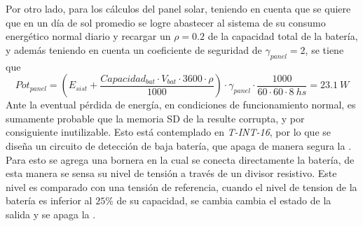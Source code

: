 Por otro lado, para los cálculos del panel solar, teniendo en cuenta que se quiere que en un día de sol promedio se logre abastecer al sistema de su consumo energético normal diario y recargar un $\rho = 0.2$ de la capacidad total de la batería, y además teniendo en cuenta un coeficiente de seguridad de $\gamma_{panel} = 2$, se tiene que
\begin{equation}
	Pot_{panel} = \left( E_{sist} + \frac{Capacidad_{bat}\cdot V_{bat}\cdot 3600\cdot \rho}{1000}\right)\cdot \gamma_{panel} \cdot  \frac{1000}{60\cdot 60\cdot 8 \ hs} = 23.1 \ W
\end{equation}
Ante la eventual pérdida de energía, en condiciones de funcionamiento normal, es sumamente probable que la memoria SD de la \rspi resulte corrupta, y por consiguiente inutilizable. Esto está contemplado en \textit{T-INT-16}, por lo que se diseña un circuito de detección  de baja batería, que apaga de manera segura la \rspi.
Para esto se agrega una bornera en la cual se conecta directamente la batería, de esta manera se sensa su nivel de tensión 
a través de un divisor resistivo. Este nivel es comparado con una tensión de referencia, cuando el nivel de tension de la batería es inferior al $25\%$ de su capacidad, se cambia cambia el estado de la salida y se apaga la \rspi.
